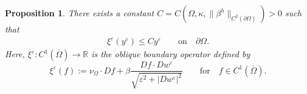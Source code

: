 \documentclass[11pt]{article}
\numberwithin{equation}{section}
\newtheorem{proposition}[theorem]{Proposition}
\newcommand{\R}{\mathbb{R}}
\newcommand{\pOmega}[0]{\partial\Omega}
\newcommand{\closure}[1]{\overline{#1}}
\def\leq{\leqslant}
\begin{document}
\begin{proposition}\label{prop:w/o-multiplier}
There exists a constant $C=C(\Omega,\kappa,\|\beta^h\|_{C^2(\partial\Omega)})>0$ such that
\begin{align*}
\xi^\varepsilon(y^{\varepsilon})\leq Cy^{\varepsilon}\qquad\text{on}\quad\partial\Omega.
\end{align*}
Here, $\xi^\varepsilon:C^1(\closure{\Omega})\to\R$ is the oblique boundary operator defined by
$$
\xi^\varepsilon(f) := \nu_{\Omega}\cdot Df + \beta\frac{Df\cdot Dw^{\varepsilon}}{\sqrt{\varepsilon^2+|Dw^{\varepsilon}|^2}}\qquad\text{for}\quad f\in C^1(\overline{\Omega}).
$$

\end{proposition}
\end{document}
